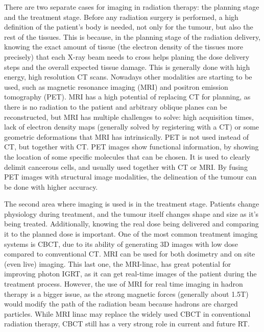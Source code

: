 There are two separate cases for imaging in radiation therapy: the planning stage and the treatment stage. Before any radiation surgery is performed, a high definition of the patient's body is needed, not only for the tumour, but also the rest of the tissues. This is because, in the planning stage of  the radiation delivery, knowing the exact amount of tissue (the electron density of the tissues more precisely) that each X-ray beam needs to cross helps planing the dose delivery steps and the overall expected tissue damage. This is generally done with high energy, high resolution CT scans. Nowadays other modalities are starting to be used, such as magnetic resonance imaging (MRI)\cite{schmidt2015radiotherapy} and positron emission tomography (PET). MRI has a high potential of replacing CT for planning, as there is no radiation to the patient and arbitrary oblique planes can be reconstructed, but MRI has multiple challenges to solve: high acquisition times, lack of electron density maps (generally solved by registering with a CT) or some geometric deformations that MRI has intrinsically. PET is not used instead of CT, but together with CT. PET images show functional information, by showing the location of some specific molecules that can be chosen. It is used to clearly delimit cancerous cells, and usually used together with CT\cite{soykut2013use} or MRI. By fusing PET images with structural image modalities, the delineation of the tumour can be done with higher accuracy. 

The second area where imaging is used is in the treatment stage. Patients change physiology during treatment, and the tumour itself changes shape and size as it's being treated. Additionally, knowing the real dose being delivered and comparing it to the planned dose is important. One of the most common treatment imaging systems is CBCT\cite{ding2007study}, due to its ability of generating 3D images with low dose compared to comventional CT. MRI can be used for both dosimetry\cite{ozenne2017improved} and on site (even live) imaging. This last one, the MRI-linac, has great potential for improving photon IGRT, as it can get real-time images of the patient during the treatment process\cite{LAGENDIJK200825}. However, the use of MRI for real time imaging in hadron therapy is a bigger issue, as the strong magnetic forces (generally about 1.5T) would modify the path of the radiation beam because hadrons are charged particles. While MRI linac may replace the widely used CBCT in conventional radiation therapy, CBCT still has a very strong role in current and future RT.

